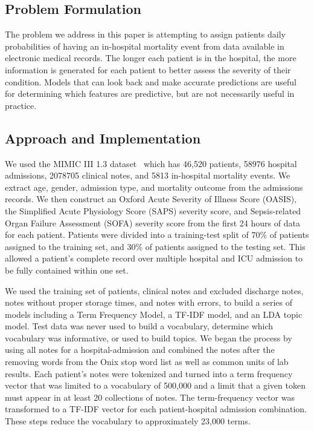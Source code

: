 \documentclass[journal]{IEEEtran}
\begin{document}
\subsection{Problem Formulation}

The problem we address in this paper is attempting to assign patients daily probabilities of having an in-hospital mortality event from data available in electronic medical records.   The longer each patient is in the hospital, the more information is generated for each patient to better assess the severity of their condition.  Models that can look back and make accurate predictions are useful for determining which features are predictive, but are not necessarily useful in practice.

\subsection{Approach and Implementation}

We used the MIMIC III 1.3 dataset~\cite{saeed_multiparameter_2011} which has 46,520 patients, 58976 hospital admissions, 2078705 clinical notes, and 5813 in-hospital mortality events.  We extract age, gender, admission type, and mortality outcome from the admissions records.  We then construct an  Oxford Acute Severity of Illness Score (OASIS), the Simplified Acute Physiology Score (SAPS) severity score, and Sepsis-related Organ Failure Assessment (SOFA) severity score from the first 24 hours of data for each patient.  Patients were divided into a training-test split of 70\% of patients assigned to the training set, and 30\% of patients assigned to the testing set.  This allowed a patient's complete record over multiple hospital and ICU admission to be fully contained within one set.

We used the training set of patients, clinical notes and excluded discharge notes, notes without proper storage times, and notes with errors, to build a series of models including a Term Frequency Model, a TF-IDF model, and an LDA topic model.   Test data was never used to build a vocabulary, determine which vocabulary was informative, or used to build topics.  We began the process by using all notes for a hospital-admission and combined the notes after the removing words from the Onix stop word list as well as common units of lab results.   Each patient's notes were tokenized and turned into a term frequency vector that was limited to a vocabulary of 500,000 and a limit that a given token must appear in at least 20 collections of notes.   The term-frequency vector was transformed to a TF-IDF vector for each patient-hospital admission combination.  These steps reduce the vocabulary to approximately 23,000 terms.
\end{document}
